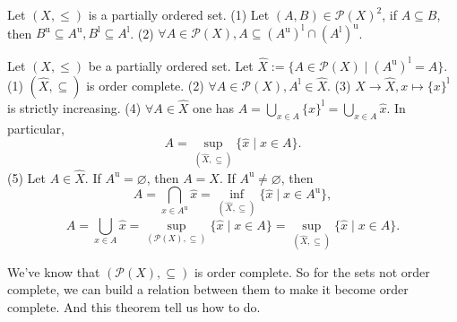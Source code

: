 \begin{lemmaenv}
    Let $(X, \le)$ is a partially ordered set.
    \newline
    (1) Let $(A, B)\in \mathscr{P}(X)^2$,  if $A\subseteq B$,  then $B^\mathrm{u}\subseteq A^\mathrm{u}, B^\mathrm{l}\subseteq A^\mathrm{l}$.
    \newline
    (2) $\forall A\in \mathscr{P}(X), A\subseteq (A^\mathrm{u})^\mathrm{l}\cap (A^\mathrm{l})^\mathrm{u}$.
\end{lemmaenv}

\begin{theoremenv}
    \quad
    \newline
    Let $(X, \le )$ be a partially ordered set. Let $\hat{X}:=\{A\in \mathscr{P} (X)\mid (A^\mathrm{u})^\mathrm{l}=A\}$.
\newline
(1) $(\hat{X}, \subseteq)$ is order complete.
\newline
(2) $\forall A\in \mathscr{P}(X), A^\mathrm{l}\in \hat{X}$.
\newline
(3) $X\rightarrow \hat{X}, x\mapsto \{x\}^\mathrm{l}$ is strictly increasing.
\newline
(4) $\forall A\in \hat{X}$ one has $A=\bigcup_{x\in A}\{x\}^\mathrm{l}=\bigcup_{x\in A}\hat{x}$. In particular,  
$$A=\sup_{(\hat{X}, \subseteq)}\{\hat{x}\mid x\in A\}.$$
(5) Let $A\in \hat{X}$. If $A^\mathrm{u}=\varnothing$,  then $A=X$. If $A^\mathrm{u}\not=\varnothing$, then 
$$A=\bigcap_{x\in A^\mathrm{u}}\hat{x}=\inf_{(\hat{X}, \subseteq)}\{\hat{x}\mid x\in A^\mathrm{u}\}, $$
$$A=\bigcup_{x\in A}\hat{x}=\sup_{(\mathscr{P}(X), \subseteq)}\{\hat{x}\mid x\in A\}=\sup_{(\hat{X}, \subseteq)}\{\hat{x}\mid x \in A\}.$$
\end{theoremenv}
\begin{remark}
    We've know that $(\mathscr{P}(X), \subseteq)$ is order complete. So for the sets not order complete,  we can build a relation between them to make it become order complete. And this theorem tell us how to do.
\end{remark}
